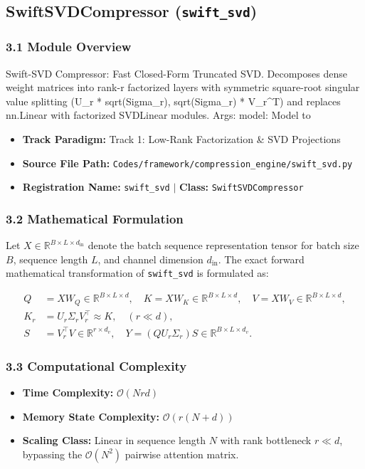 \subsection{SwiftSVDCompressor (\texttt{swift\_svd})}
\label{sec:app_module_swift_svd}

\subsubsection*{3.1 Module Overview}
Swift-SVD Compressor: Fast Closed-Form Truncated SVD.  Decomposes dense weight matrices into rank-r factorized layers with symmetric square-root singular value splitting (U\_r * sqrt(Sigma\_r), sqrt(Sigma\_r) * V\_r^T) and replaces nn.Linear with factorized SVDLinear modules.  Args:     model: Model to
\begin{itemize}
    \item \textbf{Track Paradigm:} Track 1: Low-Rank Factorization & SVD Projections
    \item \textbf{Source File Path:} \texttt{Codes/framework/compression\_engine/swift\_svd.py}
    \item \textbf{Registration Name:} \texttt{swift\_svd} $\mid$ \textbf{Class:} \texttt{SwiftSVDCompressor}
\end{itemize}

\subsubsection*{3.2 Mathematical Formulation}
Let $X \in \mathbb{R}^{B \times L \times d_{\text{in}}}$ denote the batch sequence representation tensor for batch size $B$, sequence length $L$, and channel dimension $d_{\text{in}}$. The exact forward mathematical transformation of \texttt{swift\_svd} is formulated as:

\begin{align}
Q &= X W_Q \in \mathbb{R}^{B \times L \times d}, \quad K = X W_K \in \mathbb{R}^{B \times L \times d}, \quad V = X W_V \in \mathbb{R}^{B \times L \times d}, \\
K_r &= U_r \Sigma_r V_r^\top \approx K, \quad (r \ll d), \\
S &= V_r^\top V \in \mathbb{R}^{r \times d_v}, \quad Y = (Q U_r \Sigma_r) S \in \mathbb{R}^{B \times L \times d_v}.
\end{align}


\subsubsection*{3.3 Computational Complexity}
\begin{itemize}
    \item \textbf{Time Complexity:} $\mathcal{O}(N r d)$
    \item \textbf{Memory State Complexity:} $\mathcal{O}(r(N + d))$
    \item \textbf{Scaling Class:} Linear in sequence length $N$ with rank bottleneck $r \ll d$, bypassing the $\mathcal{O}(N^2)$ pairwise attention matrix.
\end{itemize}

